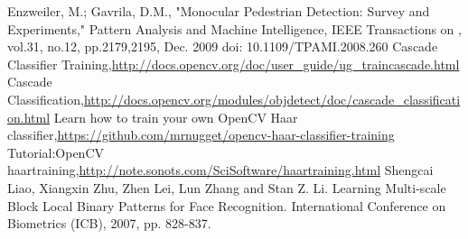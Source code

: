 \documentclass[10pt,technote]{IEEEtran}
\begin{document}



\begin{thebibliography}{99}
Enzweiler, M.; Gavrila, D.M., "Monocular Pedestrian Detection: Survey and Experiments," Pattern Analysis and Machine Intelligence, IEEE Transactions on , vol.31, no.12, pp.2179,2195, Dec. 2009
doi: 10.1109/TPAMI.2008.260
Cascade Classifier Training,\url{http://docs.opencv.org/doc/user_guide/ug_traincascade.html}
Cascade Classification,\url{http://docs.opencv.org/modules/objdetect/doc/cascade_classification.html}
Learn how to train your own OpenCV Haar classifier,\url{https://github.com/mrnugget/opencv-haar-classifier-training}
Tutorial:OpenCV haartraining,\url{http://note.sonots.com/SciSoftware/haartraining.html}	
Shengcai Liao, Xiangxin Zhu, Zhen Lei, Lun Zhang and Stan Z. Li. Learning Multi-scale Block Local Binary Patterns for Face Recognition. International Conference on Biometrics (ICB), 2007, pp. 828-837.
\end{thebibliography}
%
\end{document}

